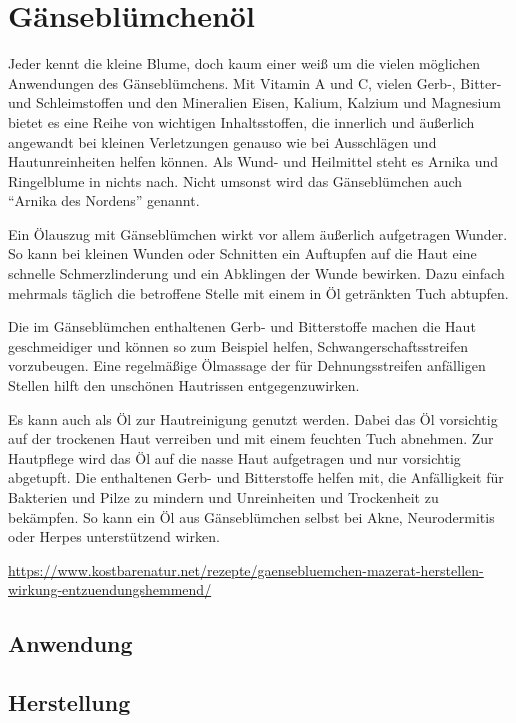 \newpage



\section{Gänseblümchenöl}


Jeder kennt die kleine Blume, doch kaum einer weiß um die vielen möglichen Anwendungen des Gänseblümchens. Mit Vitamin A und C, vielen Gerb-, Bitter- und Schleimstoffen und den Mineralien Eisen, Kalium, Kalzium und Magnesium bietet es eine Reihe von wichtigen Inhaltsstoffen, die innerlich und äußerlich angewandt bei kleinen Verletzungen genauso wie bei Ausschlägen und Hautunreinheiten helfen können. Als Wund- und Heilmittel steht es Arnika und Ringelblume in nichts nach. Nicht umsonst wird das Gänseblümchen auch “Arnika des Nordens” genannt.

Ein Ölauszug mit Gänseblümchen wirkt vor allem äußerlich aufgetragen Wunder. So kann bei kleinen Wunden oder Schnitten ein Auftupfen auf die Haut eine schnelle Schmerzlinderung und ein Abklingen der Wunde bewirken. Dazu einfach mehrmals täglich die betroffene Stelle mit einem in Öl getränkten Tuch abtupfen.

Die im Gänseblümchen enthaltenen Gerb- und Bitterstoffe machen die Haut geschmeidiger und können so zum Beispiel helfen, Schwangerschaftsstreifen vorzubeugen. Eine regelmäßige Ölmassage der für Dehnungsstreifen anfälligen Stellen hilft den unschönen Hautrissen entgegenzuwirken.

Es kann auch als Öl zur Hautreinigung genutzt werden. Dabei das Öl vorsichtig auf der trockenen Haut verreiben und mit einem feuchten Tuch abnehmen. Zur Hautpflege wird das Öl auf die nasse Haut aufgetragen und nur vorsichtig abgetupft. Die enthaltenen Gerb- und Bitterstoffe helfen mit, die Anfälligkeit für Bakterien und Pilze zu mindern und Unreinheiten und Trockenheit zu bekämpfen. So kann ein Öl aus Gänseblümchen selbst bei Akne, Neurodermitis oder Herpes unterstützend wirken.

\url{https://www.kostbarenatur.net/rezepte/gaensebluemchen-mazerat-herstellen-wirkung-entzuendungshemmend/}

\subsection{Anwendung}
\subsection{Herstellung}

